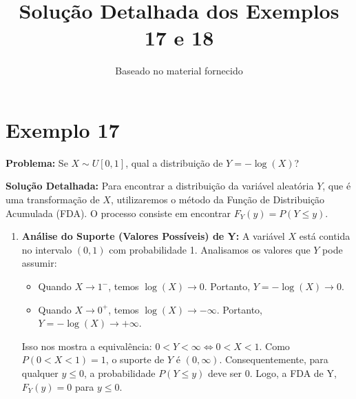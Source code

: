 \documentclass{article}
\title{Solução Detalhada dos Exemplos 17 e 18}
\author{Baseado no material fornecido}
\date{}
\begin{document}
	\maketitle
	
	\section*{Exemplo 17}
	
	\textbf{Problema:} Se $X \sim U[0, 1]$, qual a distribuição de $Y = -\log(X)$?
	
	\textbf{Solução Detalhada:}
	Para encontrar a distribuição da variável aleatória $Y$, que é uma transformação de $X$, utilizaremos o método da Função de Distribuição Acumulada (FDA). O processo consiste em encontrar $F_Y(y) = P(Y \le y)$.
	
	\begin{enumerate}
		\item \textbf{Análise do Suporte (Valores Possíveis) de Y:}
		A variável $X$ está contida no intervalo $(0, 1)$ com probabilidade 1. Analisamos os valores que $Y$ pode assumir:
		\begin{itemize}
			\item Quando $X \to 1^-$, temos $\log(X) \to 0$. Portanto, $Y = -\log(X) \to 0$.
			\item Quando $X \to 0^+$, temos $\log(X) \to -\infty$. Portanto, $Y = -\log(X) \to +\infty$.
		\end{itemize}
		Isso nos mostra a equivalência: $0 < Y < \infty \iff 0 < X < 1$.
		Como $P(0 < X < 1) = 1$, o suporte de $Y$ é $(0, \infty)$. Consequentemente, para qualquer $y \le 0$, a probabilidade $P(Y \le y)$ deve ser 0.
		Logo, a FDA de Y, $F_Y(y) = 0$ para $y \le 0$.
		

\end{enumerate}
\end{document}
